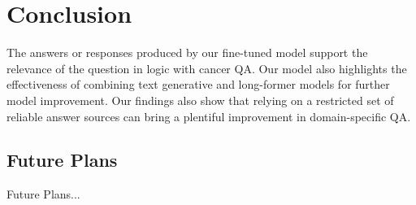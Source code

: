\section*{Conclusion}
	The answers or responses produced by our fine-tuned model support the relevance of the question in logic with cancer QA. Our model also highlights the effectiveness of combining text generative and long-former models for further model improvement. Our findings also show that relying on a restricted set of reliable answer sources can bring a plentiful improvement in domain-specific QA.
	
	\subsection*{Future Plans}
		Future Plans...